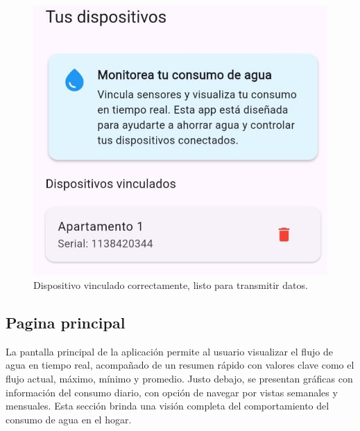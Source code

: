\documentclass[conference]{IEEEtran}
\begin{document}
\begin{figure}[htbp]
    \centerline{\includegraphics[width=\linewidth]{Prototipo4.jpg}}
    \caption{Dispositivo vinculado correctamente, listo para transmitir datos.}
    \label{fig}
\end{figure}


\newpage
\subsection*{\textbf{Pagina principal}}
La pantalla principal de la aplicación permite al usuario visualizar el flujo de agua en tiempo real, acompañado de un resumen rápido con valores clave como el flujo actual, máximo, mínimo y promedio. Justo debajo, se presentan gráficas con información del consumo diario, con opción de navegar por vistas semanales y mensuales. Esta sección brinda una visión completa del comportamiento del consumo de agua en el hogar.
\end{document}
